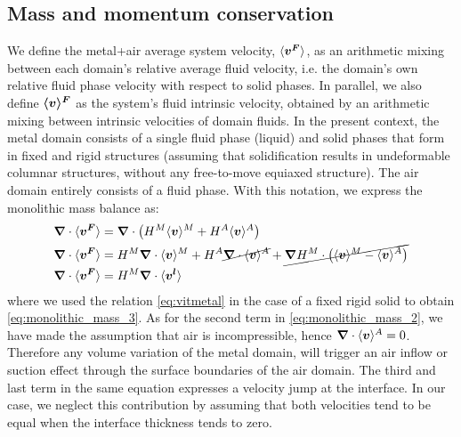\subsection{Mass and momentum conservation}
We define the metal+air average system velocity, $\langle \boldsymbol{v^F} \rangle$, as an arithmetic mixing between each domain's relative average fluid velocity,
i.e. the domain's own relative fluid phase velocity with respect to solid phases. In parallel, we also define $\boldsymbol{\langle v \rangle^F}$ as the system's 
fluid intrinsic velocity, obtained by an arithmetic mixing between intrinsic velocities of domain fluids. 
In the present context, the metal domain consists of a single fluid phase (liquid) and solid phases that form in fixed and rigid structures 
(assuming that solidification results in undeformable columnar structures, without any free-to-move equiaxed structure).
The air domain entirely consists of a fluid phase.
With this notation, we express the monolithic mass balance as:
\begin{align}
\label{eq:monolithic_mass_1}
& \boldsymbol{\nabla} \cdot \langle \boldsymbol{v^F} \rangle = \boldsymbol{\nabla} \cdot \left( H^M \langle \boldsymbol{v} \rangle^M + H^A \langle \boldsymbol{v} \rangle^A \right) \\
\label{eq:monolithic_mass_2}
& \boldsymbol{\nabla} \cdot \langle \boldsymbol{v^F} \rangle = H^M \boldsymbol{\nabla} \cdot \langle \boldsymbol{v} \rangle^M + H^A \cancel{\boldsymbol{\nabla} \cdot \langle \boldsymbol{v} \rangle^A} + \cancel{\boldsymbol{\nabla} H^M \cdot \left( \langle \boldsymbol{v} \rangle^M - \langle \boldsymbol{v} \rangle^A \right)}\\
\label{eq:monolithic_mass_3}
& \boldsymbol{\nabla} \cdot \langle \boldsymbol{v^F} \rangle = H^M \boldsymbol{\nabla} \cdot \langle \boldsymbol{v^l} \rangle
\end{align}
where we used the relation \cref{eq:vitmetal} in the case of a fixed rigid solid to obtain \cref{eq:monolithic_mass_3}.
As for the second term in \cref{eq:monolithic_mass_2}, we have made the assumption that air is incompressible, hence $\boldsymbol{\nabla} \cdot \langle \boldsymbol{v} \rangle^A= 0$. 
Therefore any volume variation of the metal domain, will trigger an air inflow or suction effect through the surface boundaries of
the air domain. The third and last term in the same equation 
expresses a velocity jump at the interface. 
In our case, we neglect this contribution by assuming that both velocities tend to be equal
when the interface thickness tends to zero. 

